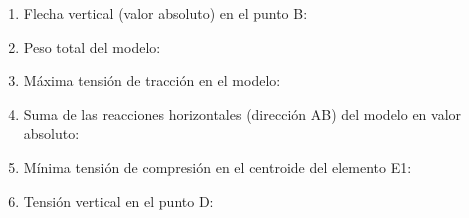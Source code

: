 \documentclass[spanish,a4paper,12pt]{article}
\begin{document}
\begin{enumerate}
\item Flecha vertical (valor absoluto) en el punto B:
  \begin{multicols}{4}
\columnbreak
{}
\columnbreak
{} %
\columnbreak
{}
  \end{multicols}
\item Peso total del modelo:
  \begin{multicols}{4}
\columnbreak
{} 
\columnbreak
{}
\columnbreak
{} %
  \end{multicols}
\item M\'axima tensi\'on de tracci\'on en el modelo:
  \begin{multicols}{4}
\columnbreak
{} 
\columnbreak
{}%
\columnbreak
{}
\end{multicols}
\item Suma de las reacciones horizontales (direcci\'on AB) del modelo en valor absoluto:
  \begin{multicols}{4}
\columnbreak
{} 
\columnbreak
{}%
\columnbreak
{}
\end{multicols}
\item M\'inima tensi\'on de compresi\'on en el centroide del elemento E1:
  \begin{multicols}{4}
\columnbreak
{} 
\columnbreak
{}%
\columnbreak
{}
\end{multicols}
\item Tensi\'on vertical en el punto D:
  \begin{multicols}{4}
\columnbreak
{} 
\columnbreak
{}
\columnbreak
{}
\end{multicols}
\end{enumerate}
\end{document}
